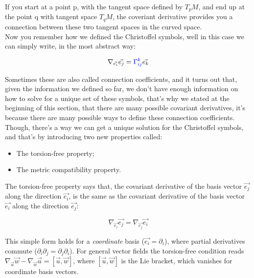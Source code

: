 If you start at a point p, with the tangent space defined by $T_pM$, and end up at the point q with tangent space $T_qM$, the coveriant derivative provides you
a connection between these two tangent spaces in the curved space.\\

Now you remember how we defined the Christoffel symbols, well in this case we can simply write, in the most abstract way:

\begin{equation}
    \nabla_{\vec{e_i}}\vec{e_j} = \begingroup\color{blue}\Gamma^k_{ij}\endgroup\vec{e_k}
\end{equation}

Sometimes these are also called connection coefficients, and it turns out that, given the information we defined so far, 
we don't have enough information on how to solve for a unique set of these symbols, that's why we stated at the beginning of this section, 
that there are many possible covariant derivatives, it's because there are many possible ways to define these connection coefficients.\\

Though, there's a way we can get a unique solution for the Christoffel symbols, and that's by introducing two new properties called:

\begin{itemize}
    \item The torsion-free property;
    \item The metric compatibility property.
\end{itemize}

The torsion-free property says that, the covariant derivative of the basis vector $\vec{e_j}$ along the direction $\vec{e_i}$, is the same
as the covariant derivative of the basis vector $\vec{e_i}$ along the direction $\vec{e_j}$:

\begin{equation}
    \nabla_{\vec{e_i}}\vec{e_j} =  \nabla_{\vec{e_j}}\vec{e_i}
\end{equation}

This simple form holds for a \textit{coordinate} basis ($\vec{e_i} = \partial_i$), where partial derivatives commute ($\partial_i\partial_j = \partial_j\partial_i$).
For general vector fields the torsion-free condition reads $\nabla_{\vec{u}}\vec{w} - \nabla_{\vec{w}}\vec{u} = [\vec{u}, \vec{w}]$, where $[\vec{u}, \vec{w}]$ is the Lie bracket,
which vanishes for coordinate basis vectors.

